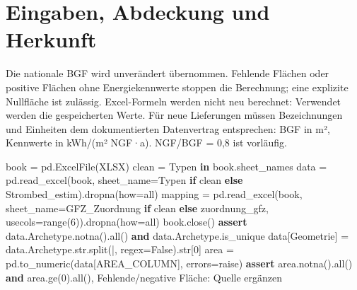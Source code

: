 \documentclass[
  ngerman,
  a4paper,
  DIV=11]{scrreprt}
\newenvironment{Shaded}{\begin{snugshade}}{\end{snugshade}}
\newcommand{\BuiltInTok}[1]{\textcolor[rgb]{0.00,0.23,0.31}{#1}}
\newcommand{\ControlFlowTok}[1]{\textcolor[rgb]{0.00,0.23,0.31}{\textbf{#1}}}
\newcommand{\DecValTok}[1]{\textcolor[rgb]{0.68,0.00,0.00}{#1}}
\newcommand{\KeywordTok}[1]{\textcolor[rgb]{0.00,0.23,0.31}{\textbf{#1}}}
\newcommand{\NormalTok}[1]{\textcolor[rgb]{0.00,0.23,0.31}{#1}}
\newcommand{\OperatorTok}[1]{\textcolor[rgb]{0.37,0.37,0.37}{#1}}
\newcommand{\StringTok}[1]{\textcolor[rgb]{0.13,0.47,0.30}{#1}}
\newcommand{\VariableTok}[1]{\textcolor[rgb]{0.07,0.07,0.07}{#1}}
\begin{document}
\section{Eingaben, Abdeckung und
Herkunft}\label{eingaben-abdeckung-und-herkunft}

Die nationale BGF wird unverändert übernommen. Fehlende Flächen oder
positive Flächen ohne Energiekennwerte stoppen die Berechnung; eine
explizite Nullfläche ist zulässig. Excel-Formeln werden nicht neu
berechnet: Verwendet werden die gespeicherten Werte. Für neue
Lieferungen müssen Bezeichnungen und Einheiten dem dokumentierten
Datenvertrag entsprechen: BGF in m², Kennwerte in kWh/(m² NGF·a).
NGF/BGF = 0,8 ist vorläufig.

\begin{Shaded}
\begin{Highlighting}[]
\NormalTok{book }\OperatorTok{=}\NormalTok{ pd.ExcelFile(XLSX)}
\NormalTok{clean }\OperatorTok{=} \StringTok{\textquotesingle{}Typen\textquotesingle{}} \KeywordTok{in}\NormalTok{ book.sheet\_names}
\NormalTok{data }\OperatorTok{=}\NormalTok{ pd.read\_excel(book, sheet\_name}\OperatorTok{=}\StringTok{\textquotesingle{}Typen\textquotesingle{}} \ControlFlowTok{if}\NormalTok{ clean }\ControlFlowTok{else} \StringTok{\textquotesingle{}Strombed\_estim\textquotesingle{}}\NormalTok{).dropna(how}\OperatorTok{=}\StringTok{\textquotesingle{}all\textquotesingle{}}\NormalTok{)}
\NormalTok{mapping }\OperatorTok{=}\NormalTok{ pd.read\_excel(book, sheet\_name}\OperatorTok{=}\StringTok{\textquotesingle{}GFZ\_Zuordnung\textquotesingle{}} \ControlFlowTok{if}\NormalTok{ clean }\ControlFlowTok{else} \StringTok{\textquotesingle{}zuordnung\_gfz\textquotesingle{}}\NormalTok{, usecols}\OperatorTok{=}\BuiltInTok{range}\NormalTok{(}\DecValTok{6}\NormalTok{)).dropna(how}\OperatorTok{=}\StringTok{\textquotesingle{}all\textquotesingle{}}\NormalTok{)}
\NormalTok{book.close()}
\ControlFlowTok{assert}\NormalTok{ data.Archetype.notna().}\BuiltInTok{all}\NormalTok{() }\KeywordTok{and}\NormalTok{ data.Archetype.is\_unique}
\NormalTok{data[}\StringTok{\textquotesingle{}Geometrie\textquotesingle{}}\NormalTok{] }\OperatorTok{=}\NormalTok{ data.Archetype.}\BuiltInTok{str}\NormalTok{.split(}\StringTok{\textquotesingle{}|\textquotesingle{}}\NormalTok{, regex}\OperatorTok{=}\VariableTok{False}\NormalTok{).}\BuiltInTok{str}\NormalTok{[}\DecValTok{0}\NormalTok{]}
\NormalTok{area }\OperatorTok{=}\NormalTok{ pd.to\_numeric(data[AREA\_COLUMN], errors}\OperatorTok{=}\StringTok{\textquotesingle{}raise\textquotesingle{}}\NormalTok{)}
\ControlFlowTok{assert}\NormalTok{ area.notna().}\BuiltInTok{all}\NormalTok{() }\KeywordTok{and}\NormalTok{ area.ge(}\DecValTok{0}\NormalTok{).}\BuiltInTok{all}\NormalTok{(), }\StringTok{\textquotesingle{}Fehlende/negative Fläche: Quelle ergänzen\textquotesingle{}}

\end{Highlighting}
\end{Shaded}
\end{document}
